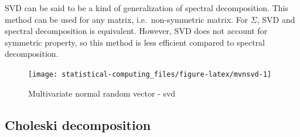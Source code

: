 \documentclass[]{book}
\newenvironment{Shaded}{\begin{snugshade}}{\end{snugshade}}
\newcommand{\ControlFlowTok}[1]{\textcolor[rgb]{0.13,0.29,0.53}{\textbf{#1}}}
\newcommand{\DataTypeTok}[1]{\textcolor[rgb]{0.13,0.29,0.53}{#1}}
\newcommand{\DecValTok}[1]{\textcolor[rgb]{0.00,0.00,0.81}{#1}}
\newcommand{\KeywordTok}[1]{\textcolor[rgb]{0.13,0.29,0.53}{\textbf{#1}}}
\newcommand{\NormalTok}[1]{#1}
\newcommand{\OperatorTok}[1]{\textcolor[rgb]{0.81,0.36,0.00}{\textbf{#1}}}
\newcommand{\OtherTok}[1]{\textcolor[rgb]{0.56,0.35,0.01}{#1}}
\newcommand{\StringTok}[1]{\textcolor[rgb]{0.31,0.60,0.02}{#1}}
\theoremstyle{definition}
\theoremstyle{definition}
\theoremstyle{definition}
\theoremstyle{remark}
\begin{document}
SVD can be said to be a kind of generalization of spectral decomposition. This method can be used for any matrix, i.e.~non-symmetric matrix. For \(\Sigma\), SVD and spectral decomposition is equivalent. However, SVD does not account for symmetric property, so this method is less efficient compared to spectral decomposition.

\begin{Shaded}
\end{Shaded}

\begin{figure}[H]

{\centering \texttt{[image: statistical-computing\_files/figure-latex/mvnsvd-1]} 

}

\caption{Multivariate normal random vector - svd}\label{fig:mvnsvd}
\end{figure}

\hypertarget{choleski-decomposition}{%
\subsection{Choleski decomposition}\label{choleski-decomposition}}
\end{document}
